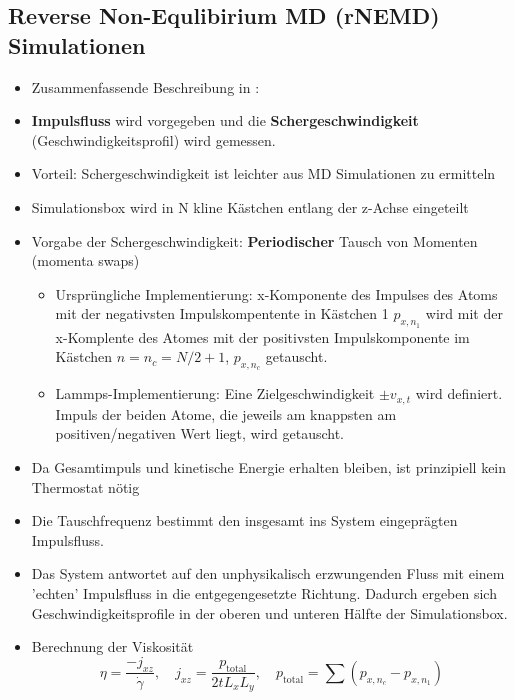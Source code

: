 \documentclass[a4paper, 10pt, 
               numbers=noenddot, toc=graduated,
               headsepline=true, footsepline=true,
               twoside=false, titlepage=true, 
               bibliography=totoc]{scrartcl}
\begin{document}
\subsection{Reverse Non-Equlibirium MD  (rNEMD) Simulationen}
	\begin{itemize}
		 \item Zusammenfassende Beschreibung in \cite{Tenney2010}:
		  \item \textbf{Impulsfluss} wird vorgegeben und die \textbf{Schergeschwindigkeit} (Geschwindigkeitsprofil) wird gemessen.
		  \item Vorteil: Schergeschwindigkeit ist leichter aus MD Simulationen zu ermitteln
		  \item Simulationsbox wird in N kline Kästchen entlang der z-Achse eingeteilt
		  \item Vorgabe der Schergeschwindigkeit: \textbf{Periodischer} Tausch von Momenten (momenta swaps) 
		  		\begin{itemize}
			  		\item Ursprüngliche Implementierung: x-Komponente des Impulses des Atoms mit der negativsten Impulskompentente in Kästchen 1 $p_{x,n_1}$ wird mit der x-Komplente des Atomes mit der positivsten Impulskomponente im Kästchen $n = n_c = N/2 + 1$, $p_{x,n_c}$ getauscht.
			  		\item Lammps-Implementierung: Eine Zielgeschwindigkeit $\pm v_{x,t}$ wird definiert. Impuls der beiden Atome, die jeweils am knappsten am positiven/negativen Wert liegt, wird getauscht.
		  		\end{itemize}
		  \item Da Gesamtimpuls und kinetische Energie erhalten bleiben, ist prinzipiell kein Thermostat nötig
		  \item Die Tauschfrequenz bestimmt den insgesamt ins System eingeprägten Impulsfluss.
		  \item Das System antwortet auf den unphysikalisch erzwungenden Fluss mit einem 'echten' Impulsfluss in die entgegengesetzte Richtung. Dadurch ergeben sich Geschwindigkeitsprofile in der oberen und unteren Hälfte der Simulationsbox.
		  
  		  \item Berechnung der Viskosität
  		  		 \begin{equation}
  		   		 	\eta = \frac{-j_{xz} }{\dot{\gamma} },\quad j_{xz} = \frac{p_{\mathrm{total}}}{2 t L_x L_y},\quad p_{\mathrm{total} }= \sum (p_{x,n_c} - p_{x,n_1})
  		   		\end{equation}
  		   

\end{itemize}
\end{document}
